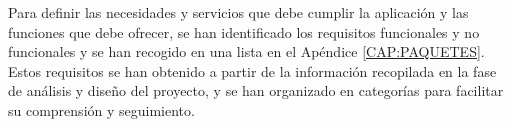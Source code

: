 Para definir las necesidades y servicios que debe cumplir la aplicación y las funciones que debe ofrecer, se han identificado los requisitos funcionales y no funcionales y se han recogido en una lista en el Apéndice \ref{CAP:PAQUETES}.
Estos requisitos se han obtenido a partir de la información recopilada en la fase de análisis y diseño del proyecto, y se han organizado en categorías para facilitar su comprensión y seguimiento.